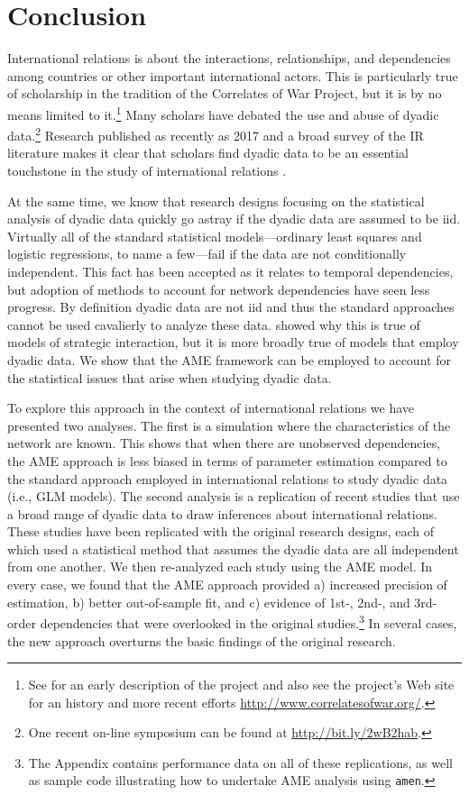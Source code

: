 \section{\textbf{Conclusion}}

International relations is about the interactions, relationships, and dependencies among countries or other important international actors. This is particularly true of scholarship in the tradition of the Correlates of War Project, but it is by no means limited to it.\footnote{See \cite{singer:1972} for an early description of the project and also see the project's Web site for an history and more recent efforts \url{http://www.correlatesofwar.org/}.} Many scholars have debated the use and abuse of dyadic data.\footnote{One recent on-line symposium can be found at \url{http://bit.ly/2wB2hab}.} Research published as recently as 2017 and a broad survey of the IR literature makes it clear that scholars find dyadic data to be an essential touchstone in the study of international relations \citep{erikson:pinto:2014,aronow:etal:2015}.

At the same time, we know that research designs focusing on the statistical analysis of dyadic data quickly go astray if the dyadic data are assumed to be iid.  Virtually all of the standard statistical models---ordinary least squares and logistic regressions, to name a few---fail if the data are not conditionally independent. This fact has been accepted as it relates to temporal dependencies, but adoption of methods to account for network dependencies have seen less progress. By definition dyadic data are not iid and thus the standard approaches cannot be used cavalierly to analyze these data.  \citet{signorino:1999} showed why this is true of models of strategic interaction, but it is more broadly true of models that employ dyadic data.  We show that the AME framework can be employed to account for the statistical issues that arise when studying dyadic data.

To explore this approach in the context of international relations we have presented two analyses. The first is a simulation where the characteristics of the network are known. This shows that when there are unobserved dependencies, the AME approach is less biased in terms of parameter estimation compared to the standard approach employed in international relations to study dyadic data (i.e., GLM models). The second analysis is a replication of recent studies that use a broad range of dyadic data to draw inferences about international relations.  These studies have been replicated with the original research designs, each of which used a statistical method that assumes the dyadic data are all independent from one another.  We then re-analyzed each study using the AME model.  In every case, we found that the AME approach provided a) increased precision of estimation, b) better out-of-sample fit, and c) evidence of 1st-, 2nd-, and 3rd-order dependencies that were overlooked in the original studies.\footnote{The Appendix contains performance data on all of these replications, as well as sample code illustrating how to undertake AME analysis using \texttt{amen}.} In several cases, the new approach overturns the basic findings of the original research.

